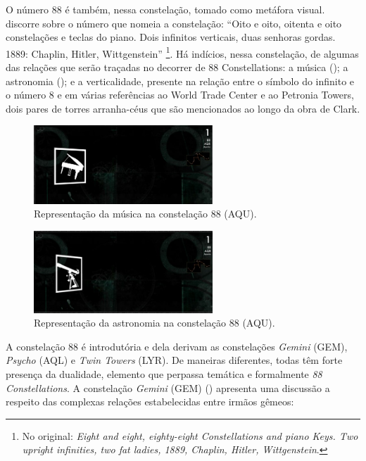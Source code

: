 \documentclass[portuguese]{textolivre}
\begin{document}
O número 88 é também, nessa constelação, tomado como metáfora visual. \textcite{clark2010} discorre sobre o número que nomeia a constelação: “Oito e oito, oitenta e oito constelações e teclas do piano. Dois infinitos verticais, duas senhoras gordas. 1889: Chaplin, Hitler, Wittgenstein” \cite[n. p., tradução nossa]{clark2010}\footnote{No original: \emph{Eight and eight, eighty-eight Constellations and piano Keys. Two upright infinities, two fat ladies, 1889, Chaplin, Hitler, Wittgenstein}.}. Há indícios, nessa constelação, de algumas das relações que serão traçadas no decorrer de 88 Constellations: a música (); a astronomia (); e a verticalidade, presente na relação entre o símbolo do infinito e o número 8 e em várias referências ao World Trade Center e ao Petronia Towers, dois pares de torres arranha-céus que são mencionados ao longo da obra de Clark. 

\begin{figure}[htbp]
 \centering
 \includegraphics[width=0.6\textwidth]{Fig3[1].jpg}
 \caption{Representação da música na constelação 88 (AQU).}
 \label{fig3}
\end{figure}

\begin{figure}[htbp]
 \centering
 \includegraphics[width=0.6\textwidth]{Fig4[1].jpg}
 \caption{Representação da astronomia na constelação 88 (AQU).}
 \label{fig4}
\end{figure}

A constelação 88 é introdutória e dela derivam as constelações \emph{Gemini} (GEM), \emph{Psycho} (AQL) e \emph{Twin Towers} (LYR). De maneiras diferentes, todas têm forte presença da dualidade, elemento que perpassa temática e formalmente \emph{88 Constellations}. A constelação \emph{Gemini} (GEM) () apresenta uma discussão a respeito das complexas relações estabelecidas entre irmãos gêmeos: 
\end{document}
